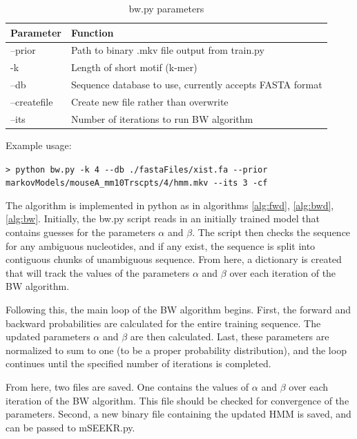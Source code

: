\begin{table}[h]
\centering
 \begin{tabular}{|l l|}
 \hline
 Parameter & Function\\
 \hline
 --prior & Path to binary .mkv file output from train.py \\
 -k & Length of short motif (k-mer) \\
 --db & Sequence database to use, currently accepts FASTA format\\
 --createfile & Create new file rather than overwrite\\
 --its & Number of iterations to run BW algorithm \\
 \hline
 
\end{tabular}
\caption{bw.py parameters}
\label{tab:bwparams}
\end{table}

Example usage: 

\lstinline{> python bw.py -k 4 --db ./fastaFiles/xist.fa --prior markovModels/mouseA_mm10Trscpts/4/hmm.mkv --its 3 -cf}

The algorithm is implemented in python as in algorithms \ref{alg:fwd}, \ref{alg:bwd}, \ref{alg:bw}. Initially, the bw.py script reads in an initially trained model that contains guesses for the parameters $\alpha$ and $\beta$. The script then checks the sequence for any ambiguous nucleotides, and if any exist, the sequence is split into contiguous chunks of unambiguous sequence. From here, a dictionary is created that will track the values of the parameters $\alpha$ and $\beta$ over each iteration of the BW algorithm. 



Following this, the main loop of the BW algorithm begins. First, the forward and backward probabilities are calculated for the entire training sequence. The updated parameters $\alpha$ and $\beta$ are then calculated. Last, these parameters are normalized to sum to one (to be a proper probability distribution), and the loop continues until the specified number of iterations is completed. 



From here, two files are saved. One contains the values of $\alpha$ and $\beta$ over each iteration of the BW algorithm. This file should be checked for convergence of the parameters. Second, a new binary file containing the updated HMM is saved, and can be passed to mSEEKR.py. 

